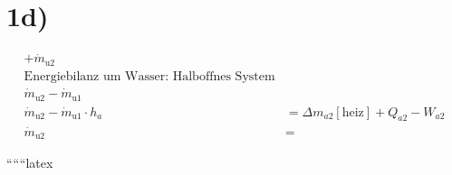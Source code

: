

\section*{1d)}

\begin{align*}
+ \dot{m}_{\text{u2}} \\
\text{Energiebilanz um Wasser: Halboffnes System} \\
\dot{m}_{\text{u2}} - \dot{m}_{\text{u1}} \\
\dot{m}_{\text{u2}} - \dot{m}_{\text{u1}} \cdot h_{a} &= \Delta m_{a2} [\text{heiz}] + Q_{a2} - W_{a2} \\
\dot{m}_{\text{u2}} &= 
\end{align*}

``````latex